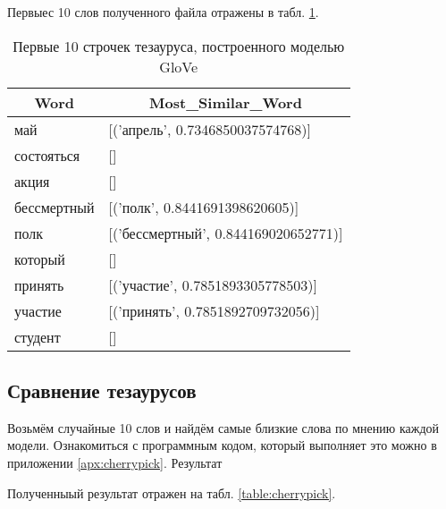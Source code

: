 \documentclass[coursework]{SCWorks}
\begin{document}
Первыес 10 слов полученного файла отражены в табл. \ref{table:glove-example}.

\begin{table}[!h]
    \centering
    \small
    \begin{tabular}{|l|l|}
        \hline
        \multicolumn{1}{|c|}{\textbf{Word}} & \multicolumn{1}{c|}{\textbf{Most\_Similar\_Word}} \\ \hline
        май                                 & {[}('апрель', 0.7346850037574768){]}              \\ \hline
        состояться                          & {[}{]}                                            \\ \hline
        акция                               & {[}{]}                                            \\ \hline
        бессмертный                         & {[}('полк', 0.8441691398620605){]}                \\ \hline
        полк                                & {[}('бессмертный', 0.844169020652771){]}          \\ \hline
        который                             & {[}{]}                                            \\ \hline
        принять                             & {[}('участие', 0.7851893305778503){]}             \\ \hline
        участие                             & {[}('принять', 0.7851892709732056){]}             \\ \hline
        студент                             & {[}{]}                                            \\ \hline
    \end{tabular}
    \caption{Первые 10 строчек тезауруса, построенного моделью GloVe}
    \label{table:glove-example}
\end{table}

\subsection{Сравнение тезаурусов}
Возьмём случайные 10 слов и найдём самые близкие слова по мнению каждой модели. Ознакомиться с программным кодом, который выполняет это можно в приложении \ref{apx:cherrypick}. Результат 

Полученныый результат отражен на табл. \ref{table:cherrypick}.
\end{document}
